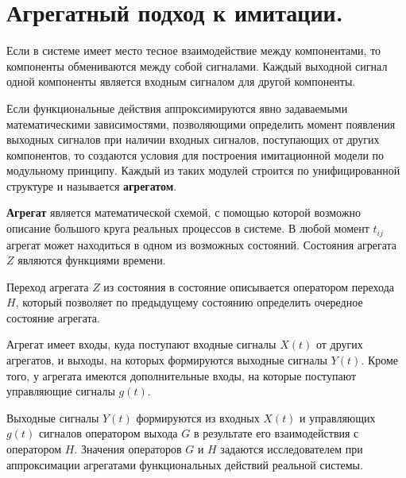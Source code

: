 \section{Агрегатный подход к имитации.}

Если в системе имеет место тесное взаимодействие между компонентами, то компоненты обмениваются между собой сигналами. Каждый выходной сигнал одной компоненты является входным сигналом для другой компоненты.

Если функциональные действия аппроксимируются явно задаваемыми математическими зависимостями, позволяющими определить момент появления выходных сигналов при наличии входных сигналов, поступающих от других компонентов, то создаются условия для построения имитационной модели по модульному принципу. Каждый из таких модулей строится по унифицированной структуре и называется \textbf{агрегатом}.

\textbf{Агрегат} является математической схемой, с помощью которой возможно описание большого круга реальных процессов в системе. В любой момент $t_{ij}$ агрегат может находиться в одном из возможных состояний. Состояния агрегата $Z$ являются функциями времени.

Переход агрегата $Z$ из состояния в состояние описывается оператором перехода $H$, который позволяет по предыдущему состоянию определить очередное состояние агрегата.

Агрегат имеет входы, куда поступают входные сигналы $X(t)$ от других агрегатов, и выходы, на которых формируются выходные сигналы $Y(t)$. Кроме того, у агрегата имеются дополнительные входы, на которые поступают управляющие сигналы $g(t)$.

Выходные сигналы $Y(t)$ формируются из входных $X(t)$ и управляющих $g(t)$ сигналов оператором выхода $G$ в результате его взаимодействия с оператором $H$. Значения операторов $G$ и $H$ задаются исследователем при аппроксимации агрегатами функциональных действий реальной системы.

\clearpage
